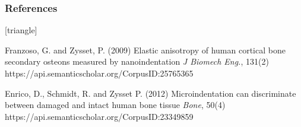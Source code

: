 \documentclass[xcolor=table,11pt]{beamer}
\begin{document}
	\begin{frame}
		\frametitle{References}
		\footnotesize{
				\begin{thebibliography}{99}
						[triangle]
						
						 Franzoso, G. and Zysset, P. (2009)
						\newblock Elastic anisotropy of human cortical bone secondary osteons measured by nanoindentation
						\newblock \textit{J Biomech Eng.}, 131(2)
						\newblock https://api.semanticscholar.org/CorpusID:25765365

						Enrico, D., Schmidt, R. and Zysset P. (2012)
						\newblock Microindentation can discriminate between damaged and intact human bone tissue
						\newblock \textit{Bone}, 50(4)
						\newblock https://api.semanticscholar.org/CorpusID:23349859
						
					\end{thebibliography}
			}
	\end{frame}
	
\end{document}
